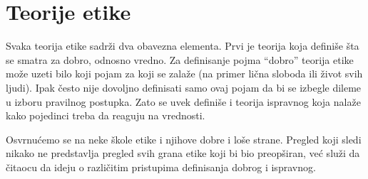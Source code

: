 \documentclass[a4paper]{article}
\begin{document}
\section{Teorije etike}
Svaka teorija etike sadrži dva obavezna elementa. Prvi je teorija koja definiše šta se smatra za dobro, odnosno vredno. Za definisanje pojma ``dobro'' teorija etike može uzeti bilo koji pojam za koji se zalaže (na primer lična sloboda ili život svih ljudi). Ipak često nije dovoljno definisati samo ovaj pojam da bi se izbegle dileme u izboru pravilnog postupka. Zato se uvek definiše i teorija ispravnog koja nalaže kako pojedinci treba da reaguju na vrednosti. 

Osvrnućemo se na neke škole etike i njihove dobre i loše strane. Pregled koji sledi nikako ne predstavlja pregled svih grana etike koji bi bio preopširan, već služi da čitaocu da ideju o različitim pristupima definisanja dobrog i ispravnog. 
\end{document}
